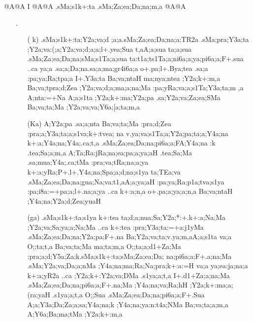 \begin{center}
{\sktf {}@A@A I @A@A .sMa;s1k+:ta%
\ZF{-}.sMa;Za;ea;Da;na;m,a @A@A}
\end{center}

\begin{itemize}

\item[{\sktf 23}.] \begin{itemize}
           
           \item[( {\sktf k})] {\sktf .sMa;s1k+:ta;Y2a;va;d%
;a;a\ZF{-}.sMa;Za;ea;Da;na;a;TR2a .sMa;pra;Y3a;ta \ZF{)} ;Y2a;va:(;a;Y2a;va;d;a;a;l+.yea;Sua\ZF{,}
\ZF{(}{\sktf 2\ZF{)}} t,aA;a;sua ta;a;sua .sMa;Za;ea;Da;na;sMa;s1Ta;a;sua\ZF{,} \ZF{)}
ta:t1a;ts1Ta;a;ni6a;a;ya;pi6a;a;F+.sua ..ca ya;a
.sa;a;Da;na\ZF{-}.sa;a;ma;gr4i6a;a o+.pa;l+.Bya;tea\ZF{,} .sa;a
:pa;ya;Ra;tpa;a I+.Y3a;ta Ba;va;ntaH ma;nya;ntea ;Y2a;k+:m,a Ba;va;tpra;d;Zea
;Y2a;va;d;a;ma;a;na;Ma :pa;yRa;va;a;s1Ta;Y3a;ta;m%
,a A;nta:=+Na A;a;s1ta ;Y2a;k+:ma;Y2a;pa
.sa;Y2a;va;Za;ea;SMa Ba;va;ta;Ma ;Y2a;va;va;Y6a;[a;ta;m,a} 

           \item[({\sktf Ka})] {\sktf A;Y2a;pa .sa;a;nta
Ba;va;ta;Ma :pra;d;Zea :pra;a;Y3a;ta;a;s1va;k+:tvea;%
na v.ya;va;s1Ta;a;Y2a;pa;ta;a;Y4a;na k+:a;Y4a;na;Y4a;.ca;t,a
.sMa;Za;ea;Da;na;pi6a;a;FA;Y4a;na :k .tea;Sa;a;m,a A;Ta;Ra:jRa;na;ea;pa;a;ya;aH%
 .tea;Sa;Ma .sa;mua;Y4a;.ca;tMa :pra;va;tRa;na;a;ya\ZF{,}
k+:a;yRa;P+.l+.Y4a;na;Spa;a;d;na;s1ya ta;TEa;va .sMa;Za;ea;Da;na;gua;Na;va:t1,aA;a;ya;aH :pa;ya;Ra;p1a;tva;s1ya :pa;i8a:=+pa;a;l+.na;a;ya ..ca\ZF{,}
k+:a;n,a o+.pa;a;ya;a;n,a Ba;va;ntaH ;Y4a;na;Y2a;d;Zea;yuaH%
}
           
           \item[({\sktf ga})] {\sktf .sMa;s1k+:ta;s1ya
k+:tea ta;d;a;nua;Sa;Y2a;*:+.k+:a;Na;Ma
;Y2a;va;Sa;ya;a;Na;Ma ..ca k+:tea :pra;Y3a;ta:=+a:j1yMa
.sMa;Za;ea;Da;na;Y2a;pa;F+.na Ba;Y2a;va;ta;v.ya;m,a\ZF{---}A;a;s1ta
va;a O;;ta;t,a Ba;va;ta;Ma ma;ta;m,a O;;ta;a;d1+Za;Ma
:pra;a;d;Y5a;Za;k\ZF{-}.sMa;s1k+:ta;sMa;Za;ea;Da;%
na;pi6a;a;F+.a;na;Ma .sMa;Y2a;va;Da;a;nMa \ZF{(};Y4a;na;ma;Ra;Na;pra;k+:a:=H va;a\ZF{),}
ya;ea:ja;na;a\ZF{,} k+:a;yR2a ..ca ;Y2a;k+:Y2a;va;DMa
.s1ya;a;t,a I+.d1+Za;a;na;Ma .sMa;Za;ea;Da;na;pi6a;a;F+.na;Ma
;Y4a;na;va;Ra;hH ;Y2a;k+:ma;a;(ra;yaH .s1ya;a;t,a O;;Sua .sMa;Za;ea;Da;na;pi6a;a;F+.Sua
A;a;Y3a;Da;Za;a;sa;Y4a;na;k ;Y4a;na;ya:n:t4a;NMa Ba;va;ta;a;m,a
A;Y6a;Ba;ma;tMa ;Y2a;k+:m,a}


\end{itemize}
\end{itemize}
